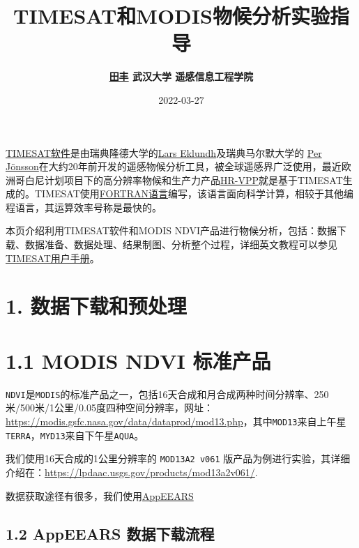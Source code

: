 \documentclass[
]{article}
\title{TIMESAT和MODIS物候分析实验指导}
\author{\textbf{\href{http://jszy.whu.edu.cn/tian_feng/}{田丰} 武汉大学
遥感信息工程学院}}
\date{2022-03-27}
\begin{document}
\maketitle

\href{https://web.nateko.lu.se/timesat/timesat.asp}{TIMESAT软件}是由瑞典隆德大学的\href{https://web.nateko.lu.se/Personal/Lars.Eklundh/}{Lars
Eklundh}及瑞典马尔默大学的
\href{https://mau.se/en/persons/per.jonsson/}{Per
Jönsson}在大约20年前开发的遥感物候分析工具，被全球遥感界广泛使用，最近欧洲哥白尼计划项目下的高分辨率物候和生产力产品\href{https://land.copernicus.eu/pan-european/biophysical-parameters/high-resolution-vegetation-phenology-and-productivity}{HR-VPP}就是基于TIMESAT生成的。TIMESAT使用\href{https://baike.baidu.com/item/FORTRAN\%E8\%AF\%AD\%E8\%A8\%80/295590}{FORTRAN语言}编写，该语言面向科学计算，相较于其他编程语言，其运算效率号称是最快的。

本页介绍利用TIMESAT软件和MODIS
NDVI产品进行物候分析，包括：数据下载、数据准备、数据处理、结果制图、分析整个过程，详细英文教程可以参见\href{/}{TIMESAT用户手册}。

\hypertarget{ux6570ux636eux4e0bux8f7dux548cux9884ux5904ux7406}{%
\section{\texorpdfstring{\textbf{1.
数据下载和预处理}}{1. 数据下载和预处理}}\label{ux6570ux636eux4e0bux8f7dux548cux9884ux5904ux7406}}

\hypertarget{modis-ndvi-ux6807ux51c6ux4ea7ux54c1}{%
\section{1.1 MODIS NDVI
标准产品}\label{modis-ndvi-ux6807ux51c6ux4ea7ux54c1}}

\texttt{NDVI}是\texttt{MODIS}的标准产品之一，包括16天合成和月合成两种时间分辨率、250米/500米/1公里/0.05度四种空间分辨率，网址：\url{https://modis.gsfc.nasa.gov/data/dataprod/mod13.php}，其中\texttt{MOD13}来自上午星\texttt{TERRA}，\texttt{MYD13}来自下午星\texttt{AQUA}。

我们使用16天合成的1公里分辨率的 \texttt{MOD13A2\ v061}
版产品为例进行实验，其详细介绍在：\url{https://lpdaac.usgs.gov/products/mod13a2v061/}.

数据获取途径有很多，我们使用\href{https://lpdaacsvc.cr.usgs.gov/appeears/}{AppEEARS}

\hypertarget{appeears-ux6570ux636eux4e0bux8f7dux6d41ux7a0b}{%
\subsection{1.2 AppEEARS
数据下载流程}\label{appeears-ux6570ux636eux4e0bux8f7dux6d41ux7a0b}}
\end{document}
